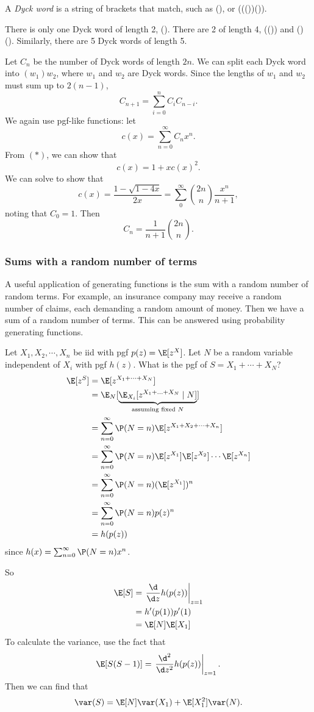 \documentclass[a4paper]{article}
\begin{document}
\begin{eg}
  A \emph{Dyck word} is a string of brackets that match, such as (), or ((())()).

  There is only one Dyck word of length 2, (). There are 2 of length 4, (()) and ()(). Similarly, there are 5 Dyck words of length 5.

  Let $C_n$ be the number of Dyck words of length $2n$. We can split each Dyck word into $(w_1)w_2$, where $w_1$ and $w_2$ are Dyck words. Since the lengths of $w_1$ and $w_2$ must sum up to $2(n -1)$,
  \[
    C_{n + 1} = \sum_{i = 0}^n C_iC_{n - i}.\tag{$*$}
  \]
  We again use pgf-like functions: let
  \[
    c(x) = \sum_{n = 0}^\infty C_n x^n.
  \]
  From $(*)$, we can show that
  \[
    c(x) = 1 + xc(x)^2.
  \]
  We can solve to show that
  \[
    c(x) = \frac{1 - \sqrt{1 - 4x}}{2x} = \sum_0^\infty \binom{2n}{n}\frac{x^n}{n + 1},
  \]
  noting that $C_0 = 1$. Then
  \[
    C_n = \frac{1}{n + 1}\binom{2n}{n}.
  \]
\end{eg}

\subsubsection*{Sums with a random number of terms}
A useful application of generating functions is the sum with a random number of random terms. For example, an insurance company may receive a random number of claims, each demanding a random amount of money. Then we have a sum of a random number of terms. This can be answered using probability generating functions.

\begin{eg}
Let $X_1, X_2, \cdots, X_n$ be iid with pgf $p(z) = \E[z^X]$. Let $N$ be a random variable independent of $X_i$ with pgf $h(z)$. What is the pgf of $S = X_1 + \cdots + X_N$?
\begin{align*}
  \E[z^{S}] &= \E[z^{X_1 + \cdots + X_N}]\\
  &= \E_N[\underbrace{\E_{X_i}[z^{X_1 + \ldots + X_N}\mid N]}_{\text{assuming fixed }N}]\\
  &= \sum_{n = 0}^\infty \P(N = n) \E[z^{X_1 + X_2 + \cdots + X_n}]\\
  &= \sum_{n = 0}^\infty \P(N = n) \E[z^{X_1}] \E[z^{X_2}]\cdots\E[z^{X_n}]\\
  &= \sum_{n = 0}^\infty \P(N = n) (\E[z^{X_1}])^n\\
  &= \sum_{n = 0}^\infty \P(N = n) p(z)^n \\
  &= h(p(z))
\end{align*}
since $h(x) = \sum_{n = 0}^\infty \P(N = n) x^n$.

So
\begin{align*}
  \E[S] &= \left.\frac{\d }{\d z}h(p(z))\right|_{z = 1}\\
  &= h'(p(1))p'(1)\\
  &= \E[N]\E[X_1]
\end{align*}
To calculate the variance, use the fact that
\[
  \E[S(S - 1)] = \left.\frac{\d ^2}{\d z^2}h(p(z))\right|_{z = 1}.
\]
Then we can find that
\[
  \var (S) = \E[N]\var(X_1) + \E[X_1^2]\var(N).
\]
\end{eg}
\end{document}
